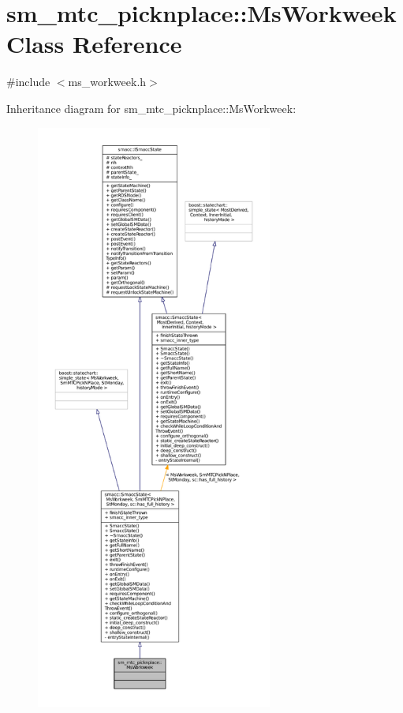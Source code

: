 \hypertarget{classsm__mtc__picknplace_1_1MsWorkweek}{}\section{sm\+\_\+mtc\+\_\+picknplace\+:\+:Ms\+Workweek Class Reference}
\label{classsm__mtc__picknplace_1_1MsWorkweek}


{\ttfamily \#include $<$ms\+\_\+workweek.\+h$>$}



Inheritance diagram for sm\+\_\+mtc\+\_\+picknplace\+:\+:Ms\+Workweek\+:
\nopagebreak
\begin{figure}[H]
\begin{center}
\leavevmode
\includegraphics[height=550pt]{classsm__mtc__picknplace_1_1MsWorkweek__inherit__graph}
\end{center}
\end{figure}


